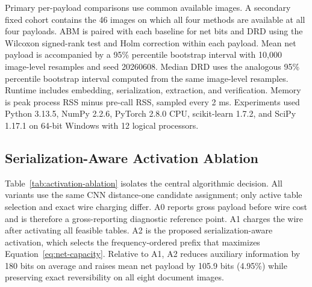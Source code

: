 \documentclass[a4paper,fleqn]{cas-dc}
\begin{document}
Primary per-payload comparisons use common available images. A secondary fixed
cohort contains the 46 images on which all four methods are available at all
four payloads. ABM is paired with each baseline for net bits and DRD using the
Wilcoxon signed-rank test and Holm correction within each payload. Mean net
payload is accompanied by a 95\% percentile bootstrap interval with 10,000
image-level resamples and seed 20260608. Median DRD uses the analogous 95\%
percentile bootstrap interval computed from the same image-level resamples.
Runtime includes embedding,
serialization, extraction, and verification. Memory is peak process RSS minus
pre-call RSS, sampled every 2 ms. Experiments used Python 3.13.5, NumPy 2.2.6,
PyTorch 2.8.0 CPU, scikit-learn 1.7.2, and SciPy 1.17.1 on 64-bit Windows with
12 logical processors.

\subsection{Serialization-Aware Activation Ablation}
\label{subsec:component-ablations}

Table~\ref{tab:activation-ablation} isolates the central algorithmic decision.
All variants use the same CNN distance-one candidate assignment; only active
table selection and exact wire charging differ. A0 reports gross payload before
wire cost and is therefore a gross-reporting diagnostic reference point. A1
charges the wire after activating all feasible tables. A2 is the proposed
serialization-aware activation, which selects the frequency-ordered prefix that
maximizes Equation~\ref{eq:net-capacity}. Relative to A1, A2 reduces auxiliary
information by 180 bits on average and raises mean net payload by 105.9 bits
(4.95\%) while preserving exact reversibility on all eight document images.

\begin{table}[t]
\centering
\caption{Central ablation of serialization-aware mapping activation on the
eight document images. Values are means in bits except DRD; the post-hoc value
in A0 is the net payload obtained when the exact wire is charged after the
gross-only selection.}
\label{tab:activation-ablation}
\end{table}
\end{document}
